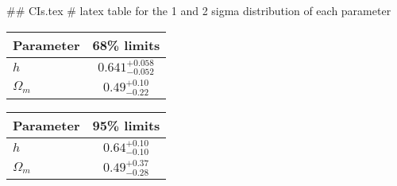 ## CIs.tex
# latex table for the 1 and 2 sigma distribution of each parameter

\begin{tabular} { l  c}
 Parameter &  68\% limits\\
\hline
{\boldmath$h              $} & $0.641^{+0.058}_{-0.052}   $\\
{\boldmath$\Omega_m       $} & $0.49^{+0.10}_{-0.22}      $\\
\hline
\end{tabular}

\begin{tabular} { l  c}
 Parameter &  95\% limits\\
\hline
{\boldmath$h              $} & $0.64^{+0.10}_{-0.10}      $\\
{\boldmath$\Omega_m       $} & $0.49^{+0.37}_{-0.28}      $\\
\hline
\end{tabular}
